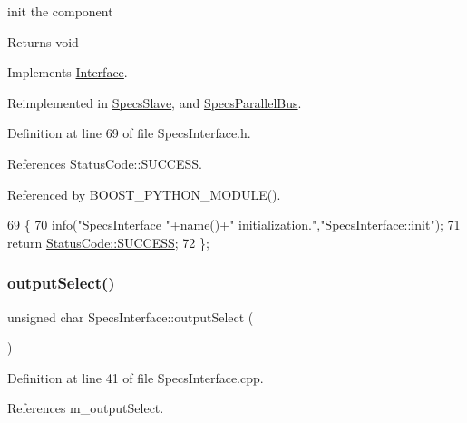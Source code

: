 init the component

\begin{DoxyReturn}{Returns}
void 
\end{DoxyReturn}


Implements \hyperlink{classInterface_a1d095c113b1e89d1f5f68323856fee63}{Interface}.



Reimplemented in \hyperlink{classSpecsSlave_ab34b5117373a334027d3a5cf33287bb6}{Specs\+Slave}, and \hyperlink{classSpecsParallelBus_a43d9435450ba71990004638e42eec1ae}{Specs\+Parallel\+Bus}.



Definition at line 69 of file Specs\+Interface.\+h.



References Status\+Code\+::\+S\+U\+C\+C\+E\+SS.



Referenced by B\+O\+O\+S\+T\+\_\+\+P\+Y\+T\+H\+O\+N\+\_\+\+M\+O\+D\+U\+L\+E().


\begin{DoxyCode}
69                             \{
70     \hyperlink{classObject_a644fd329ea4cb85f54fa6846484b84a8}{info}(\textcolor{stringliteral}{"SpecsInterface "}+\hyperlink{classObject_a300f4c05dd468c7bb8b3c968868443c1}{name}()+\textcolor{stringliteral}{" initialization."},\textcolor{stringliteral}{"SpecsInterface::init"});
71     \textcolor{keywordflow}{return} \hyperlink{classStatusCode_a6f565cbeadc76d14c72f047e5e85eb4badd0da38d3ba0d922efd1f4619bc37ad8}{StatusCode::SUCCESS};
72   \};
\end{DoxyCode}
\mbox{\label{classSpecsInterface_ab291ed03f4c2f0143e14c26ad5f648dd}} 
\subsubsection{\texorpdfstring{output\+Select()}{outputSelect()}}
{\footnotesize\ttfamily unsigned char Specs\+Interface\+::output\+Select (\begin{DoxyParamCaption}{ }\end{DoxyParamCaption})}



Definition at line 41 of file Specs\+Interface.\+cpp.



References m\+\_\+output\+Select.




